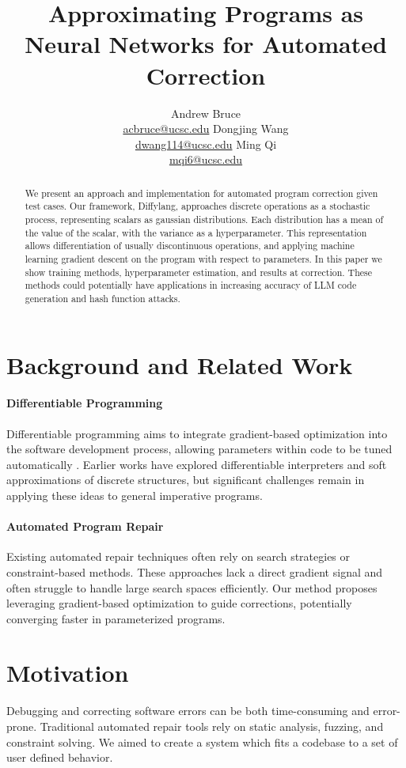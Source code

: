 \documentclass{article}
\title{Approximating Programs as Neural Networks for Automated Correction}
\author{
  Andrew Bruce \\ \href{mailto:acbruce@ucsc.edu}{acbruce@ucsc.edu}
  \And
  Dongjing Wang \\ \href{mailto:dwang114@ucsc.edu}{dwang114@ucsc.edu}
  \And
  Ming Qi \\ \href{mailto:mqi6@ucsc.edu}{mqi6@ucsc.edu}
}
\begin{document}
\maketitle

\begin{abstract}
  We present an approach and implementation for automated program correction given test cases. Our framework, Diffylang, approaches discrete operations as a stochastic process, representing scalars as gaussian distributions. Each distribution has a mean of the value of the scalar, with the variance as a hyperparameter. This representation allows differentiation of usually discontinuous operations, and applying machine learning gradient descent on the program with respect to parameters. In this paper we show training methods, hyperparameter estimation, and results at correction. These methods could potentially have applications in increasing accuracy of LLM code generation and hash function attacks.
\end{abstract}

\section{Background and Related Work}
\paragraph{Differentiable Programming} Differentiable programming aims to integrate gradient-based optimization into the software development process, allowing parameters within code to be tuned automatically \cite{blondel2024elementsdifferentiableprogramming,DBLP:journals/corr/abs-1907-07587,vandemeulebroucke2018myia}. Earlier works have explored differentiable interpreters and soft approximations of discrete structures, but significant challenges remain in applying these ideas to general imperative programs.

\paragraph{Automated Program Repair} Existing automated repair techniques often rely on search strategies or constraint-based methods. These approaches lack a direct gradient signal and often struggle to handle large search spaces efficiently. Our method proposes leveraging gradient-based optimization to guide corrections, potentially converging faster in parameterized programs.

\section{Motivation}
Debugging and correcting software errors can be both time-consuming and error-prone. Traditional automated repair tools rely on static analysis, fuzzing, and constraint solving. We aimed to create a system which fits a codebase to a set of user defined behavior.
\end{document}
